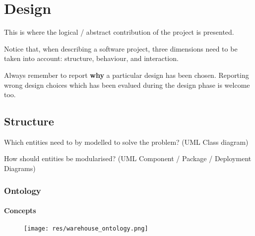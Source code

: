 \documentclass{scrartcl}
\begin{document}
\section{Design}

This is where the logical / abstract contribution of the project is presented.

Notice that, when describing a software project, three dimensions need to be taken into account: structure, behaviour, and interaction.

Always remember to report \textbf{why} a particular design has been chosen.
Reporting wrong design choices which has been evalued during the design phase is welcome too.

\subsection{Structure}

Which entities need to by modelled to solve the problem?
%
(UML Class diagram)

How should entities be modularised?
%
(UML Component / Package / Deployment Diagrams)

\subsubsection{Ontology}

\paragraph*{Concepts\vspace{12pt}\newline}

\begin{figure}[!h]\centering
    \texttt{[image: res/warehouse\_ontology.png]}    
\end{figure}
\end{document}

